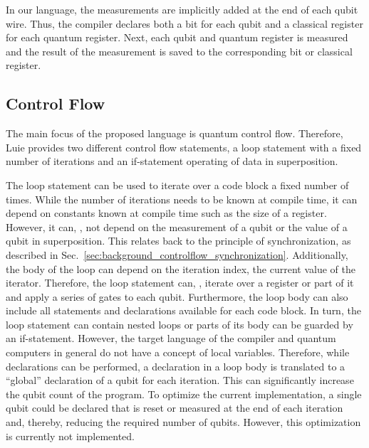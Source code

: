 In our language, the measurements are implicitly added at the end of each qubit wire. Thus, the compiler declares both a bit for each qubit and a classical register for each quantum register. Next, each qubit and quantum register is measured and the result of the measurement is saved to the corresponding bit or classical register.

\subsection{Control Flow}
\label{sec:concept_controlFlow}
The main focus of the proposed language is quantum control flow. Therefore, Luie provides two different control flow statements, a loop statement with a fixed number of iterations and an if-statement operating of data in superposition. 

The loop statement can be used to iterate over a code block a fixed number of times. While the number of iterations needs to be known at compile time, it can depend on constants known at compile time such as the size of a register. However, it can, \eg, not depend on the measurement of a qubit or the value of a qubit in superposition. This relates back to the principle of synchronization, as described in Sec.~\ref{sec:background_controlflow_synchronization}. Additionally, the body of the loop can depend on the iteration index, \ie the current value of the iterator. Therefore, the loop statement can, \eg, iterate over a register or part of it and apply a series of gates to each qubit. Furthermore, the loop body can also include all statements and declarations available for each code block. In turn, the loop statement can contain nested loops or parts of its body can be guarded by an if-statement. However, the target language of the compiler and quantum computers in general do not have a concept of local variables. Therefore, while declarations can be performed, a declaration in a loop body is translated to a ``global'' declaration of a qubit for each iteration. This can significantly increase the qubit count of the program. To optimize the current implementation, a single qubit could be declared that is reset or measured at the end of each iteration and, thereby, reducing the required number of qubits. However, this optimization is currently not implemented.

